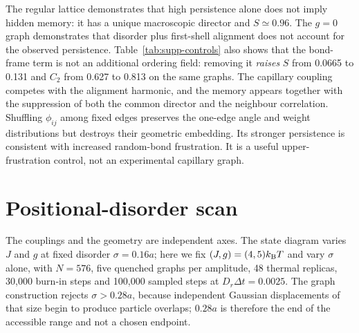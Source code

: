 \documentclass[aps,prl,onecolumn,superscriptaddress,nofootinbib]{revtex4-2}
\begin{document}
The regular lattice demonstrates that high persistence alone does not imply
hidden memory: it has a unique macroscopic director and \(S\simeq0.96\).
The \(g=0\) graph demonstrates that disorder plus first-shell alignment does
not account for the observed persistence.  Table~\ref{tab:supp-controls} also
shows that the bond-frame term is not an additional ordering field: removing
it \emph{raises} \(S\) from 0.0665 to 0.131 and \(C_2\) from 0.627 to 0.813
on the same graphs.  The capillary coupling competes with the alignment
harmonic, and the memory appears together with the suppression of both the
common director and the neighbour correlation.  Shuffling \(\phi_{ij}\) among
fixed edges preserves the one-edge angle and weight distributions but
destroys their geometric embedding.  Its stronger persistence is consistent
with increased random-bond frustration.  It is a useful upper-frustration
control, not an experimental capillary graph.

\section{Positional-disorder scan}

The couplings and the geometry are independent axes.  The state diagram
varies \(J\) and \(g\) at fixed disorder \(\sigma=0.16a\); here we fix
\((J,g)=(4,5)k_{\rm B}T\) and vary \(\sigma\) alone, with \(N=576\), five
quenched graphs per amplitude, 48 thermal replicas, 30,000 burn-in steps and
100,000 sampled steps at \(D_r\Delta t=0.0025\).  The graph construction
rejects \(\sigma>0.28a\), because independent Gaussian displacements of that
size begin to produce particle overlaps; \(0.28a\) is therefore the end of
the accessible range and not a chosen endpoint.
\end{document}
